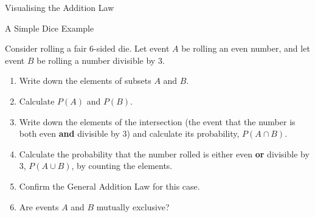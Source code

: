 \begin{frame}{Visualising the Addition Law}
    
    
\end{frame}

\begin{frame}{A Simple Dice Example}
    \begin{example}
        Consider rolling a fair 6-sided die. Let event $A$ be rolling an even number, and let event $B$ be rolling a number divisible by 3.
        
        \begin{enumerate}
            \item Write down the elements of subsets $A$ and $B$.
            \item Calculate $P(A)$ and $P(B)$.
            \item Write down the elements of the intersection (the event that the number is both even \textbf{and} divisible by 3) and calculate its probability, $P(A \cap B)$.
            \item Calculate the probability that the number rolled is either even \textbf{or} divisible by 3, $P(A \cup B)$, by counting the elements.
            \item Confirm the General Addition Law for this case.
            \item Are events $A$ and $B$ mutually exclusive?
        \end{enumerate}  
    \end{example}
\end{frame}


